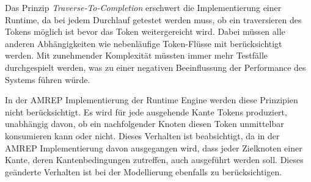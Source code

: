 Das Prinzip \emph{Traverse-To-Completion} erschwert die Implementierung einer Runtime, da bei jedem Durchlauf getestet werden muss, ob ein traversieren des Tokens möglich ist bevor das Token weitergereicht wird. Dabei müssen alle anderen Abhängigkeiten wie nebenläufige Token-Flüsse mit berücksichtigt werden. Mit zunehmender Komplexität müssten immer mehr Testfälle durchgespielt werden, was zu einer negativen Beeinflussung der Performance des Systems führen würde.

In der AMREP Implementierung der Runtime Engine werden diese Prinzipien nicht berücksichtigt. Es wird für jede ausgehende Kante Tokens produziert, unabhängig davon, ob ein nachfolgender Knoten diesen Token unmittelbar konsumieren kann oder nicht. Dieses Verhalten ist beabsichtigt, da in der AMREP Implementierung davon ausgegangen wird, dass jeder Zielknoten einer Kante, deren Kantenbedingungen zutreffen, auch ausgeführt werden soll. Dieses geänderte Verhalten ist bei der Modellierung ebenfalls zu berücksichtigen.




